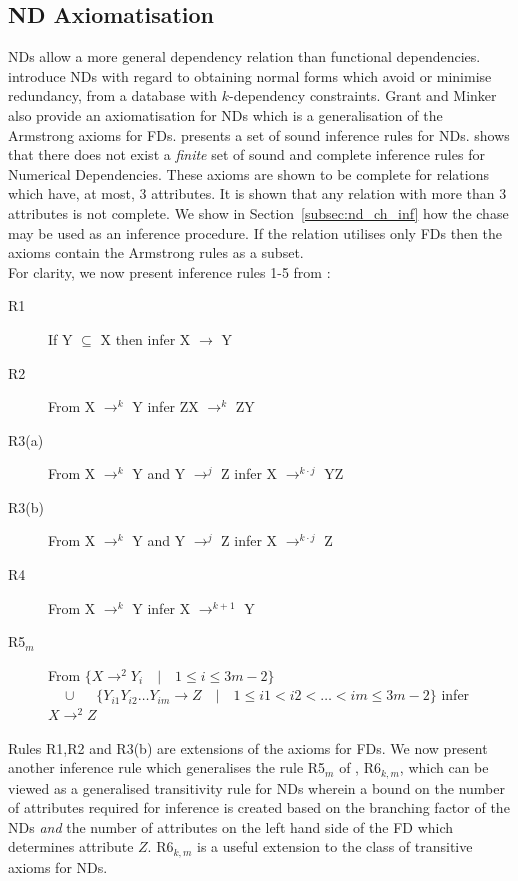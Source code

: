 \subsection{ND Axiomatisation}\label{subsec:nd_axiom}
NDs allow a more general dependency relation than functional
dependencies.  \cite{gm85a,gm85b} introduce NDs with regard
to obtaining normal forms which avoid or minimise redundancy, from a
database with $k$-dependency constraints. Grant and Minker also
provide an axiomatisation for NDs which is a
generalisation of the Armstrong axioms for 
FDs. \cite{gm85a} presents a set of sound
inference rules for NDs. \cite{gm85b} 
shows that there does not exist a {\em finite} set of sound and
complete inference rules for Numerical Dependencies.
These axioms are shown to be complete for relations which have, at most,
3 attributes.  It is shown that any relation with more than 3 attributes is
not complete. We show in Section~\ref{subsec:nd_ch_inf} how the chase may
be used as an inference procedure.
If the relation utilises only FDs then the axioms
contain the Armstrong rules as a subset.\\

For clarity, we now present inference rules 1-5 from \cite{gm85b}:
\begin{description}
\item[R1] If Y $\subseteq$ X then infer X $\to$ Y
\item[R2] From X $\to^k$ Y infer ZX $\to^k$ ZY
\item[R3(a)] From X $\to^k$ Y and Y $\to^j$ Z infer X $\to^{k \cdot j}$ YZ
\item[R3(b)] From X $\to^k$ Y and Y $\to^j$ Z infer X $\to^{k \cdot j}$ Z
\item[R4] From X $\to^k$ Y infer X $\to^{k + 1}$ Y
\item[R5$_m$] From  $\{ X \to^{2} Y_i \quad |  \quad 1 \le i \le 3m-2
\}$  \\
$\quad \cup$ $\quad \{ Y_{i1}Y_{i2} \ldots Y_{im} \to Z
\quad |  \quad 1 \le i1 < i2 < \ldots < im \le 3m-2 \}$ infer $X \to^{2} Z$
\end{description}

Rules R1,R2 and R3(b) are extensions of the axioms for FDs.
We now present another inference rule which generalises the rule
R5$_m$ of \cite{gm85b}, R6$_{k,m}$, which can be viewed as a generalised
transitivity rule for NDs wherein a bound on the number of attributes
required for inference is created based on the branching factor of the
NDs {\em and} the number of attributes on the left hand side of the FD
which determines attribute $Z$. R6$_{k,m}$ is a useful extension to
the class of transitive axioms for NDs.

